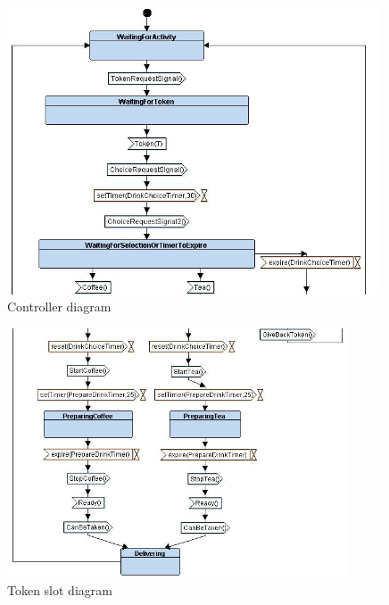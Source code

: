 \documentclass[12pt]{article}
\begin{document}
\begin{figure}[htbp]
\centering
\includegraphics[width=0.99\textwidth]{fig/controllerdiagram.jpg}
\caption{Controller diagram} \label{fig:controllerdiagram}
\end{figure}

\begin{figure}[htbp]
\centering
\includegraphics[width=0.9\textwidth]{fig/tokendiagram.jpg}
\caption{Token slot diagram} \label{fig:tokendiagram}
\end{figure}
\end{document}
